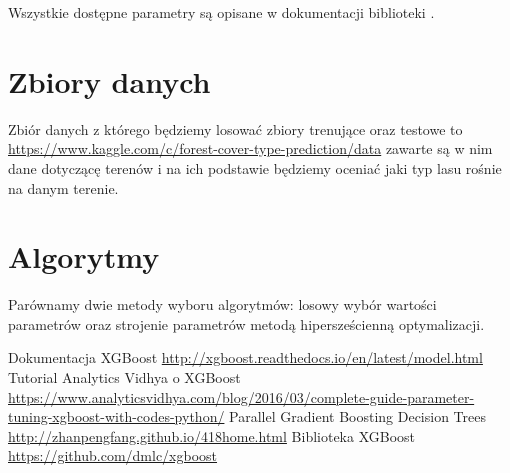 \documentclass[a4paper,12p]{article}
\begin{document}
Wszystkie dostępne parametry są opisane w dokumentacji biblioteki \cite{github}.

\section{Zbiory danych}
Zbiór danych z którego będziemy losować zbiory trenujące oraz testowe to \url{https://www.kaggle.com/c/forest-cover-type-prediction/data} zawarte są w nim dane dotyczącę terenów i na ich podstawie będziemy oceniać jaki typ lasu rośnie na danym terenie. 

\section{Algorytmy}
Parównamy dwie metody wyboru algorytmów: losowy wybór wartości parametrów oraz strojenie parametrów metodą hipersześcienną optymalizacji.


\begin{thebibliography}{1}
 Dokumentacja XGBoost \url{http://xgboost.readthedocs.io/en/latest/model.html}
 Tutorial Analytics Vidhya o XGBoost \url{https://www.analyticsvidhya.com/blog/2016/03/complete-guide-parameter-tuning-xgboost-with-codes-python/}
 Parallel Gradient Boosting Decision Trees \url{http://zhanpengfang.github.io/418home.html}
 Biblioteka XGBoost \url{https://github.com/dmlc/xgboost}
\end{thebibliography}
\end{document}
